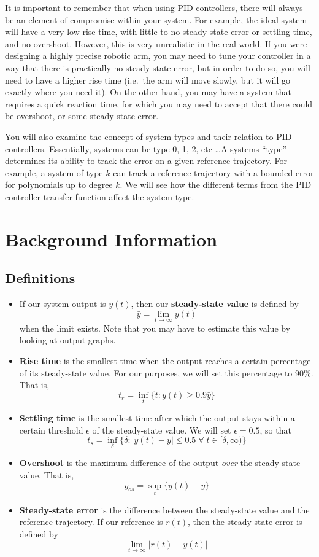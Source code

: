 It is important to remember that when using  PID controllers, there will always be an element of
compromise within your system. For example, the ideal system will have a very low rise time, with
little to no steady state error or settling time, and no overshoot. However, this is very unrealistic in
the real world. If you were designing a highly precise robotic arm, you may need to tune your
controller in a way that there is practically no steady state error, but in order to do so, you will need to
have a higher rise time (i.e.\ the arm will move slowly, but it will go exactly where you need it). On
the other hand, you may have a system that requires a quick reaction time, for which you may need
to accept that there could be overshoot, or some steady state error.

You will also examine the concept of system types and their relation to PID controllers. Essentially,
systems can be type 0, 1, 2, etc \ldots A systems ``type'' determines its ability to track
the error on a given reference trajectory. For example, a system of type \(k \) can track
a reference trajectory with a bounded error for polynomials up to degree \(k \). We will see how the different terms from the PID controller transfer function affect the system type.

\section{Background Information}
\subsection{Definitions}
\begin{itemize}
    \item If our system output is \( y(t) \), then our \textbf{steady-state value} is defined by
          \[ \bar{y} = \lim_{t \to \infty}y(t) \]
          when the limit exists. Note that you may have to estimate this value by looking at output graphs.
    \item \textbf{Rise time} is the smallest time when the output reaches a certain percentage of its steady-state value. For our purposes, we will set this percentage to 90\%. That is,
          \[ t_r = \inf_t\{ t : y(t) \ge 0.9\bar{y} \} \]
    \item \textbf{Settling time} is the smallest time after which the output stays within a certain threshold \( \epsilon \) of the steady-state value. We will set \( \epsilon = 0.5 \), so that
          \[ t_s = \inf_{\delta}\{ \delta : |y(t) - \bar{y}| \le 0.5 \; \forall \; t \in [\delta, \infty)\} \]
    \item \textbf{Overshoot} is the maximum difference of the output \emph{over} the steady-state value. That is,
          \[ y_{os} = \sup_t \{y(t) - \bar{y}\} \]
    \item \textbf{Steady-state error} is the difference between the steady-state value and the reference trajectory. If our reference is \( r(t) \), then the steady-state error is defined by
          \[ \lim_{t \to \infty}|r(t) - y(t)| \]
\end{itemize}
